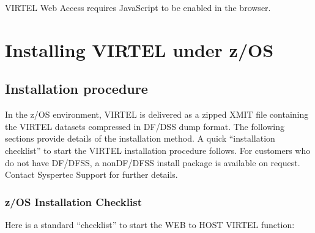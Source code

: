 \documentclass[letterpaper,10pt,english]{sphinxmanual}
\begin{document}
\sphinxAtStartPar
VIRTEL Web Access requires JavaScript to be enabled in the browser.

\label{\detokenize{Installation_Guide:virtel461ig-installz-os}}
\ignorespaces 

\chapter{Installing VIRTEL under z/OS}
\label{\detokenize{Installation_Guide:installing-virtel-under-z-os}}\label{\detokenize{Installation_Guide:index-2}}

\section{Installation procedure}
\label{\detokenize{Installation_Guide:installation-procedure}}
\sphinxAtStartPar
In the z/OS environment, VIRTEL is delivered as a zipped XMIT file containing the VIRTEL datasets compressed in DF/DSS dump format. The following sections provide details of the installation method. A quick “installation check\sphinxhyphen{}list” to start the VIRTEL installation procedure follows. For customers who do not have DF/DFSS, a non\sphinxhyphen{}DF/DFSS install package is available on request. Contact Syspertec Support for further details.

\ignorespaces 

\subsection{z/OS Installation Check\sphinxhyphen{}list}
\label{\detokenize{Installation_Guide:z-os-installation-check-list}}\label{\detokenize{Installation_Guide:index-3}}
\sphinxAtStartPar
Here is a standard “check\sphinxhyphen{}list” to start the WEB to HOST VIRTEL function:
\end{document}
